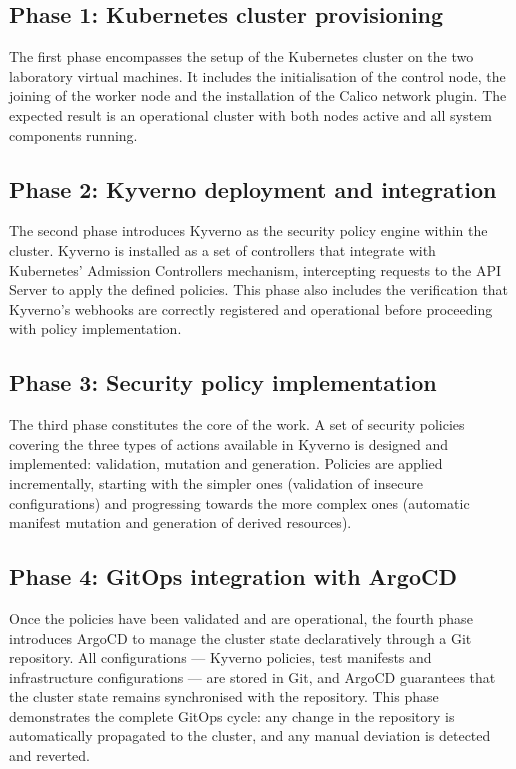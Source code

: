 \subsection{Phase 1: Kubernetes cluster provisioning}

The first phase encompasses the setup of the Kubernetes cluster on the two laboratory virtual machines. It includes the initialisation of the control node, the joining of the worker node and the installation of the Calico network plugin. The expected result is an operational cluster with both nodes active and all system components running.

\subsection{Phase 2: Kyverno deployment and integration}

The second phase introduces Kyverno as the security policy engine within the cluster. Kyverno is installed as a set of controllers that integrate with Kubernetes' Admission Controllers mechanism, intercepting requests to the API Server to apply the defined policies. This phase also includes the verification that Kyverno's webhooks are correctly registered and operational before proceeding with policy implementation.

\subsection{Phase 3: Security policy implementation}

The third phase constitutes the core of the work. A set of security policies covering the three types of actions available in Kyverno is designed and implemented: validation, mutation and generation. Policies are applied incrementally, starting with the simpler ones (validation of insecure configurations) and progressing towards the more complex ones (automatic manifest mutation and generation of derived resources).

\subsection{Phase 4: GitOps integration with ArgoCD}

Once the policies have been validated and are operational, the fourth phase introduces ArgoCD to manage the cluster state declaratively through a Git repository. All configurations --- Kyverno policies, test manifests and infrastructure configurations --- are stored in Git, and ArgoCD guarantees that the cluster state remains synchronised with the repository. This phase demonstrates the complete GitOps cycle: any change in the repository is automatically propagated to the cluster, and any manual deviation is detected and reverted.

